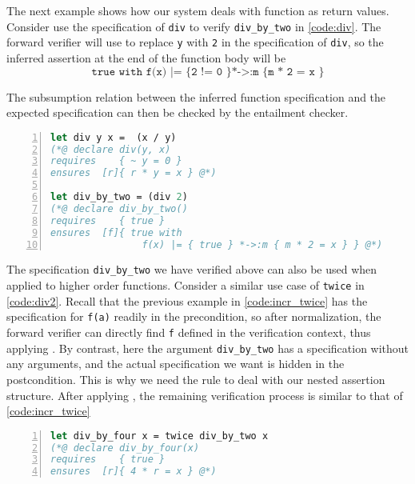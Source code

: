 The next example shows how our system deals with function as return values. Consider use the specification of \texttt{div} to verify \texttt{div\_by\_two} in \autoref{code:div}. The forward verifier will use  to replace \texttt{y} with \texttt{2} in the specification of \texttt{div}, so the inferred assertion at the end of the function body will be
$$
\texttt{
true with f(x) |= \{  2 != 0 \} *->:m \{ m * 2 = x \}
}
$$

The subsumption relation between the inferred function specification and the expected specification can then be checked by the entailment checker.

\begin{lstlisting}[language=Caml, mathescape=true, xleftmargin=2em, aboveskip=1em, xrightmargin=1em, numbers=left, frame = {TB}, caption=Function as return value, label=code:div]
let div y x =  (x / y)
(*@ declare div(y, x)
requires    { ~ y = 0 }
ensures  [r]{ r * y = x } @*)

let div_by_two = (div 2)
(*@ declare div_by_two()
requires    { true }
ensures  [f]{ true with 
                f(x) |= { true } *->:m { m * 2 = x } } @*)
\end{lstlisting}

The specification \texttt{div\_by\_two} we have verified above can also be used when applied to higher order functions. Consider a similar use case of \texttt{twice} in \autoref{code:div2}. Recall that the previous example in \autoref{code:incr_twice} has the specification for \texttt{f(a)} readily in the precondition, so after normalization, the forward verifier can directly find \texttt{f} defined in the verification context, thus applying . By contrast, here the argument \texttt{div\_by\_two} has a specification without any arguments, and the actual specification we want is hidden in the postcondition. This is why we need the rule  to deal with our nested assertion structure. After applying , the remaining verification process is similar to that of \autoref{code:incr_twice}

\begin{lstlisting}[language=Caml, mathescape=true, xleftmargin=2em, aboveskip=1em, xrightmargin=1em, numbers=left, frame = {TB}, title=Returned function as parameter, label=code:div2]
let div_by_four x = twice div_by_two x
(*@ declare div_by_four(x)
requires    { true }
ensures  [r]{ 4 * r = x } @*)
\end{lstlisting}


